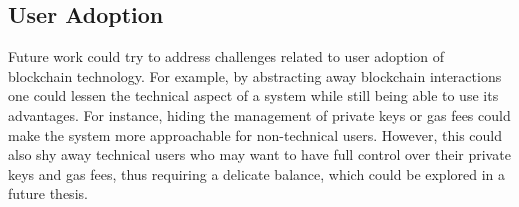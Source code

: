 \subsection{User Adoption}
Future work could try to address challenges related to user adoption of blockchain technology. For example, by abstracting away blockchain interactions one could lessen the technical aspect of a system while still being able to use its advantages. For instance, hiding the management of private keys or gas fees could make the system more approachable for non-technical users. However, this could also shy away technical users who may want to have full control over their private keys and gas fees, thus requiring a delicate balance, which could be explored in a future thesis.